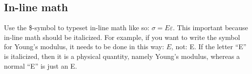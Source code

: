 \subsection{In-line math}
Use the \$-symbol to typeset in-line math like so: $\sigma = E\varepsilon$. This important because in-line math should be italicized. For example, if you want to write the symbol for Young's modulus, it needs to be done in this way: $E$, not: E. If the letter ``E'' is italicized, then it is a physical quantity, namely Young's modulus, whereas a normal ``E'' is just an E.